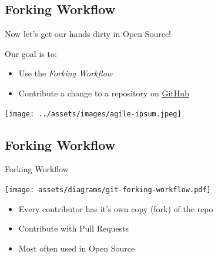 \subsection{Forking Workflow}
\begin{frame}[fragile]
  \subslidetitle

  Now let's get our hands dirty in Open Source! \\
  \vspace{1em}

  Our goal is to:
  \begin{itemize}
    \item Use the \textit{Forking Workflow}
    \item Contribute a change to a repository on \href{https://github.com}{GitHub}
  \end{itemize}

  \centerline{\texttt{[image: ../assets/images/agile-ipsum.jpeg]}}

\end{frame}

\subsection{Forking Workflow}
\begin{frame}[fragile]
  \subslidetitle
  Forking Workflow
    \centerline{\texttt{[image: assets/diagrams/git-forking-workflow.pdf]}}

  \vspace{2em}
  \begin{itemize}
    \item Every contributor has it's own copy (fork) of the repo
    \item Contribute with Pull Requests
    \item Most often used in Open Source
  \end{itemize}

\end{frame}

